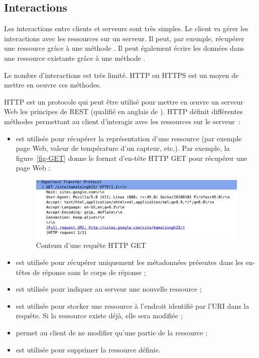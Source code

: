   \subsection{Interactions}
  
         \vspace{1em}

  Les interactions entre clients et serveurs sont très simples. Le client va gérer les interactions avec les ressources sur un serveur. Il peut, par exemple, récupérer une ressource grâce à une méthode . Il peut également écrire les données dans une ressource existante grâce à une méthode . 
  
  Le nombre d'interactions est très limité. \ac{HTTP} ou \ac{HTTPS} est un moyen de mettre en oeuvre ces méthodes. 




\ac{HTTP} est un protocole qui peut être utilisé pour mettre en œuvre un serveur Web les principes de \ac{REST} (qualifié en anglais de ). \ac{HTTP} définit différentes méthodes permettant au client d’interagir avec les ressources sur le serveur~:

\begin{itemize}
    \item {} est utilisée pour récupérer la représentation d’une ressource (par exemple page Web, valeur de température d’un capteur, etc.). Par exemple, la figure~\vref{fig-GET} donne le format d’en-tête \ac{HTTP} GET pour récupérer une page Web :

 \begin{figure}[tbp]
\centerline{\includegraphics[width=1\columnwidth]{Pictures/GET.png}}
\caption{Contenu d'une requête HTTP GET}
\label{fig-GET}
\end{figure}

\item  {} est utilisée pour récupérer uniquement les métadonnées présentes dans les en-têtes de réponse sans le corps de réponse ;
\item  {} est utilisée pour indiquer au serveur une nouvelle ressource  ;
\item  {} est utilisée pour stocker une ressource à l’endroit identifié par l’\ac{URI} dans la requête. Si la ressource existe déjà, elle sera modifiée ;
\item {} permet au client de ne modifier qu’une partie de la ressource ;
\item  {} est utilisée pour supprimer la ressource définie.


\end{itemize}

